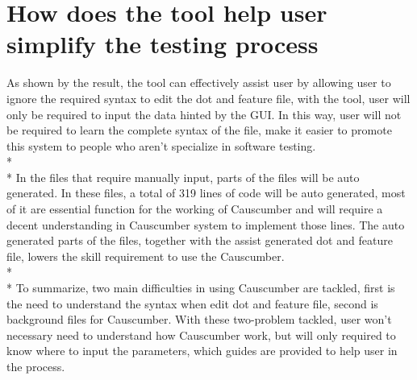 \section{How does the tool help user simplify the testing process}
As shown by the result, the tool can effectively assist user by allowing user to ignore the required syntax to edit the dot and feature file, with the tool, user will only be required to input the data hinted by the GUI. In this way, user will not be required to learn the complete syntax of the file, make it easier to promote this system to people who aren’t specialize in software testing.\\*\\*
In the files that require manually input, parts of the files will be auto generated. In these files, a total of 319 lines of code will be auto generated, most of it are essential function for the working of Causcumber and will require a decent understanding in Causcumber system to implement those lines. The auto generated parts of the files, together with the assist generated dot and feature file, lowers the skill requirement to use the Causcumber.\\*\\*
To summarize, two main difficulties in using Causcumber are tackled, first is the need to understand the syntax when edit dot and feature file, second is background files for Causcumber. With these two-problem tackled, user won’t necessary need to understand how Causcumber work, but will only required to know where to input the parameters, which guides are provided to help user in the process.






